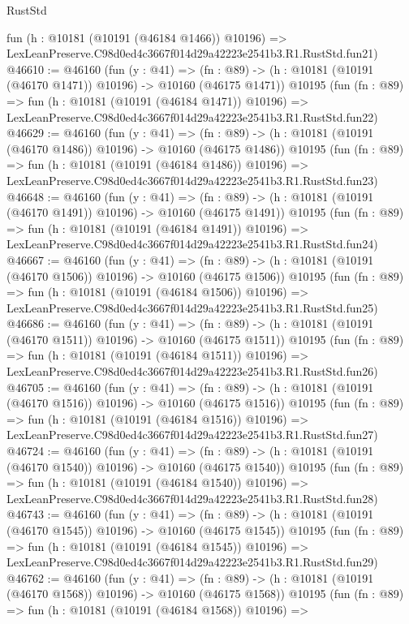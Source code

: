 \begin{lexlean}{RustStd}
\begin{coremodule}
    fun (h : @10181 (@10191 (@46184 @1466)) @10196) =>
    LexLeanPreserve.C98d0ed4c3667f014d29a42223e2541b3.R1.RustStd.fun21)
@46610 := @46160
    (fun (y : @41) =>
    (fn : @89) -> (h : @10181 (@10191 (@46170 @1471)) @10196) -> @10160 (@46175 @1471))
    @10195
    (fun (fn : @89) =>
    fun (h : @10181 (@10191 (@46184 @1471)) @10196) =>
    LexLeanPreserve.C98d0ed4c3667f014d29a42223e2541b3.R1.RustStd.fun22)
@46629 := @46160
    (fun (y : @41) =>
    (fn : @89) -> (h : @10181 (@10191 (@46170 @1486)) @10196) -> @10160 (@46175 @1486))
    @10195
    (fun (fn : @89) =>
    fun (h : @10181 (@10191 (@46184 @1486)) @10196) =>
    LexLeanPreserve.C98d0ed4c3667f014d29a42223e2541b3.R1.RustStd.fun23)
@46648 := @46160
    (fun (y : @41) =>
    (fn : @89) -> (h : @10181 (@10191 (@46170 @1491)) @10196) -> @10160 (@46175 @1491))
    @10195
    (fun (fn : @89) =>
    fun (h : @10181 (@10191 (@46184 @1491)) @10196) =>
    LexLeanPreserve.C98d0ed4c3667f014d29a42223e2541b3.R1.RustStd.fun24)
@46667 := @46160
    (fun (y : @41) =>
    (fn : @89) -> (h : @10181 (@10191 (@46170 @1506)) @10196) -> @10160 (@46175 @1506))
    @10195
    (fun (fn : @89) =>
    fun (h : @10181 (@10191 (@46184 @1506)) @10196) =>
    LexLeanPreserve.C98d0ed4c3667f014d29a42223e2541b3.R1.RustStd.fun25)
@46686 := @46160
    (fun (y : @41) =>
    (fn : @89) -> (h : @10181 (@10191 (@46170 @1511)) @10196) -> @10160 (@46175 @1511))
    @10195
    (fun (fn : @89) =>
    fun (h : @10181 (@10191 (@46184 @1511)) @10196) =>
    LexLeanPreserve.C98d0ed4c3667f014d29a42223e2541b3.R1.RustStd.fun26)
@46705 := @46160
    (fun (y : @41) =>
    (fn : @89) -> (h : @10181 (@10191 (@46170 @1516)) @10196) -> @10160 (@46175 @1516))
    @10195
    (fun (fn : @89) =>
    fun (h : @10181 (@10191 (@46184 @1516)) @10196) =>
    LexLeanPreserve.C98d0ed4c3667f014d29a42223e2541b3.R1.RustStd.fun27)
@46724 := @46160
    (fun (y : @41) =>
    (fn : @89) -> (h : @10181 (@10191 (@46170 @1540)) @10196) -> @10160 (@46175 @1540))
    @10195
    (fun (fn : @89) =>
    fun (h : @10181 (@10191 (@46184 @1540)) @10196) =>
    LexLeanPreserve.C98d0ed4c3667f014d29a42223e2541b3.R1.RustStd.fun28)
@46743 := @46160
    (fun (y : @41) =>
    (fn : @89) -> (h : @10181 (@10191 (@46170 @1545)) @10196) -> @10160 (@46175 @1545))
    @10195
    (fun (fn : @89) =>
    fun (h : @10181 (@10191 (@46184 @1545)) @10196) =>
    LexLeanPreserve.C98d0ed4c3667f014d29a42223e2541b3.R1.RustStd.fun29)
@46762 := @46160
    (fun (y : @41) =>
    (fn : @89) -> (h : @10181 (@10191 (@46170 @1568)) @10196) -> @10160 (@46175 @1568))
    @10195
    (fun (fn : @89) =>
    fun (h : @10181 (@10191 (@46184 @1568)) @10196) =>

\end{coremodule}
\end{lexlean}
